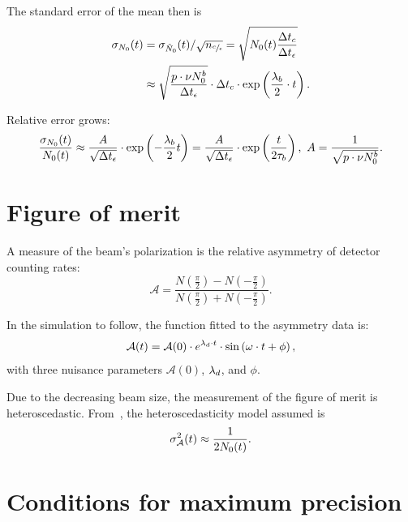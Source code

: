 \documentclass{article}
\begin{document}
The standard error of the mean then is %
\begin{align*}
\SD{N_0}(t) & = \SD{\tilde{N}_0}(t)/\sqrt{\Ncm} = \sqrt{N_0(t)\frac{\dtc}{\dtm}}            \\
& \approx \sqrt{\frac{p\cdot\nu N_0^b}{\dtm}}\cdot\dtc \cdot\exp\bkt{\frac{\lamb}{2}\cdot t}.
\end{align*}
\newcommand{\A}{\frac{1}{\sqrt{p\cdot\nu N_0^b}}}

Relative error grows:
\begin{equation}\label{eq:MeasRelErr}
	\frac{\SD{N_0}(t)}{N_0(t)} \approx \frac{A}{\sqrt{\dtm}}\cdot\exp\bkt{-\frac{\lamb}{2}t} = \frac{A}{\sqrt{\dtm}}\cdot\exp\bkt{\frac{t}{2\LTb}},~ A=\A.
\end{equation}

\section{Figure of merit}
\newcommand{\Asym}{\mathcal{A}}
A measure of the beam's polarization is the relative asymmetry of detector counting rates:~\cite[p.~17]{Eversmann}
\begin{equation}\label{eq:AsymDef}
	\Asym = \frac{N(\frac\pi2) - N(-\frac\pi2)}{N(\frac\pi2)+N(-\frac\pi2)}.
\end{equation}

In the simulation to follow, the function fitted to the asymmetry data is:
\begin{equation}\label{eq:xFOM}
	\Asym(t) = \Asym(0)\cdot e^{\lamd\cdot t}\cdot\sin\bkt{\omega\cdot t + \phi},
\end{equation}
with three nuisance parameters $\Asym(0)$, $\lambda_d$, and $\phi$. 

Due to the decreasing beam size, the measurement of the figure of merit is heteroscedastic. From~\cite[p.~18]{Eversmann}, the heteroscedasticity model assumed is
\begin{equation}\label{eq:AsymHtsk}
	\SD{\Asym}^2(t) \approx \frac{1}{2N_0(t)}.
\end{equation}

\section{Conditions for maximum precision}
\newcommand{\dtnd}{\dt_{zc}}
\newcommand{\SNR}{\text{SNR}}
\newcommand{\deq}{\overset{\triangle}{=}}
\end{document}
